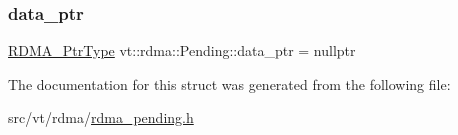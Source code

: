\subsubsection{\texorpdfstring{data\+\_\+ptr}{data\_ptr}}
{\footnotesize\ttfamily \hyperlink{namespacevt_a9e2c953286c7616f7c218e9951790776}{R\+D\+M\+A\+\_\+\+Ptr\+Type} vt\+::rdma\+::\+Pending\+::data\+\_\+ptr = nullptr}



The documentation for this struct was generated from the following file\+:\begin{DoxyCompactItemize}
\item 
src/vt/rdma/\hyperlink{rdma__pending_8h}{rdma\+\_\+pending.\+h}\end{DoxyCompactItemize}

